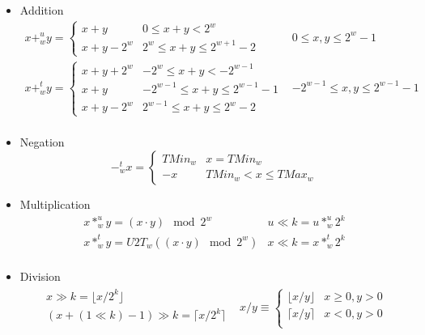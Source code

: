 \begin{itemize}
\item Addition
\begin{equation*}
\begin{array}{ll}
x+^u_wy=\begin{cases}
x + y 		& 0 \le x+y < 2^w\\
x + y - 2^w & 2^w \le x+y \le 2^{w+1} - 2
\end{cases} & 0\le x,y \le 2^w-1\\
x+^t_wy=\begin{cases}
x + y + 2^w & -2^w \le x+y < -2^{w-1}\\
x + y 			& -2^{w-1} \le x+y \le 2^{w-1} - 1\\
x + y - 2^w & 2^{w-1} \le x+y \le 2^{w}-2
\end{cases} & -2^{w-1} \le x,y \le 2^{w-1} - 1\\
\end{array}
\end{equation*}

\item Negation
\begin{equation*}
-^t_wx=\begin{cases}
TMin_w & x = TMin_w\\
-x & TMin_w < x \le TMax_w
\end{cases}
\end{equation*}

\item Multiplication
\begin{equation*}
\begin{array}{ll}
x*^u_wy = (x\cdot y)\mod 2^w & u\ll k = u * ^u_w2^k\\
x*^t_wy = U2T_w((x\cdot y)\mod 2^w) & x\ll k = x * ^t_w2^k\\
\end{array}
\end{equation*}

\item Division
\begin{equation*}
\begin{array}{ll}
\begin{gathered}
x\gg k = \lfloor x/2^k \rfloor\\
(x + (1\ll k) - 1)\gg k = \lceil x/2^k \rceil\\
\end{gathered} & 
x/y\equiv\begin{cases}
\lfloor x/y \rfloor & x \ge 0, y>0\\
\lceil x/y \rceil & x < 0, y > 0\\
\end{cases}
\end{array}
\end{equation*}
\end{itemize}
\newpage
